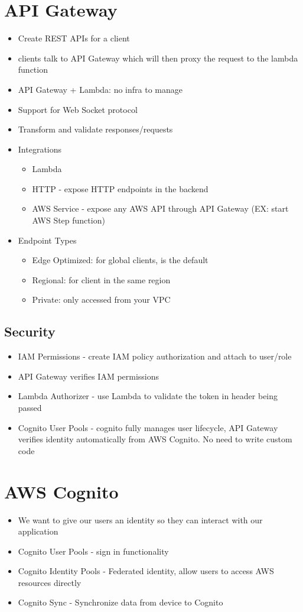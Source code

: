 \documentclass[]{scrartcl}
\begin{document}
\section{API Gateway}
\begin{itemize}
	\item Create REST APIs for a client
	\item clients talk to API Gateway which will then proxy the request to the lambda function
	\item API Gateway + Lambda: no infra to manage
	\item Support for Web Socket protocol
	\item Transform and validate responses/requests
	\item Integrations
	\begin{itemize}
		\item Lambda
		\item HTTP - expose HTTP endpoints in the backend
		\item AWS Service - expose any AWS API through API Gateway (EX: start AWS Step function)
	\end{itemize}
	\item Endpoint Types
	\begin{itemize}
		\item Edge Optimized: for global clients, is the default
		\item Regional: for client in the same region
		\item Private: only accessed from your VPC
	\end{itemize}
\end{itemize}

\subsection{Security}
\begin{itemize}
	\item IAM Permissions - create IAM policy authorization and attach to user/role
	\item API Gateway verifies IAM permissions
	\item Lambda Authorizer - use Lambda to validate the token in header being passed
	\item Cognito User Pools - cognito fully manages user lifecycle, API Gateway verifies identity automatically from AWS Cognito. No need to write custom code
\end{itemize}

\section{AWS Cognito}
\begin{itemize}
	\item We want to give our users an identity so they can interact with our application
	\item Cognito User Pools - sign in functionality
	\item Cognito Identity Pools - Federated identity, allow users to access AWS resources directly
	\item Cognito Sync - Synchronize data from device to Cognito
\end{itemize}
\end{document}

